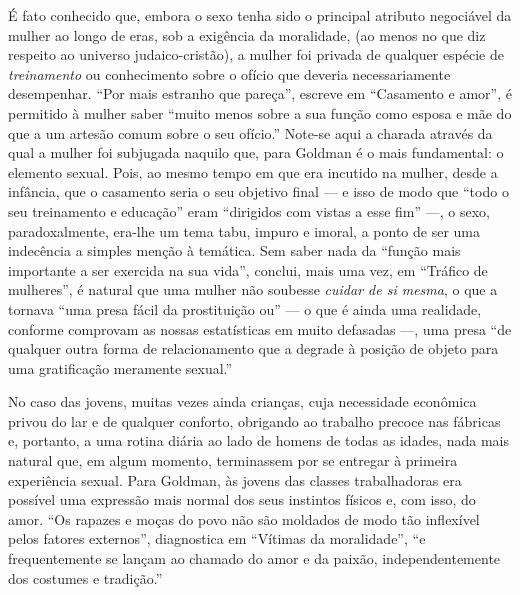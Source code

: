 É fato conhecido que, embora o sexo tenha
sido o principal atributo negociável da mulher ao longo de eras, sob a
exigência da moralidade, (ao menos no que diz respeito ao universo
judaico-cristão), a mulher foi privada de qualquer espécie de
\textit{treinamento} ou conhecimento sobre o ofício que
deveria necessariamente desempenhar. ``Por mais estranho que pareça'',
escreve em ``Casamento e amor'', é permitido à mulher saber ``muito
menos sobre a sua função como esposa e mãe do que a um artesão comum
sobre o seu ofício.'' Note-se aqui a charada através da qual a mulher
foi subjugada naquilo que, para Goldman é o mais fundamental: o elemento
sexual. Pois, ao mesmo tempo em que era incutido na mulher, desde a
infância, que o casamento seria o seu objetivo final --- e isso de modo
que ``todo o seu treinamento e educação'' eram ``dirigidos com vistas a
esse fim'' ---, o sexo, paradoxalmente, era-lhe um tema tabu, impuro e
imoral, a ponto de ser uma indecência a simples menção à temática. Sem
saber nada da ``função mais importante a ser exercida na sua vida'',
conclui, mais uma vez, em ``Tráfico de mulheres'', é natural que uma
mulher não soubesse \textit{cuidar de si mesma}, o que a tornava ``uma presa
fácil da prostituição ou'' --- o que é ainda uma realidade, conforme
comprovam as nossas estatísticas em muito defasadas ---, uma presa ``de
qualquer outra forma de relacionamento que a degrade à posição de
objeto para uma gratificação meramente sexual.''

No caso das jovens, muitas vezes ainda crianças, cuja necessidade
econômica privou do lar e de qualquer conforto, obrigando ao trabalho
precoce nas fábricas e, portanto, a uma rotina diária ao lado de homens
de todas as idades, nada mais natural que, em algum momento, terminassem
por se entregar à primeira experiência sexual. Para Goldman, às jovens
das classes trabalhadoras era possível uma expressão mais normal dos
seus instintos físicos e, com isso, do amor. ``Os rapazes e moças do
povo não são moldados de modo tão inflexível pelos fatores externos'',
diagnostica em ``Vítimas da moralidade'', ``e frequentemente se lançam
ao chamado do amor e da paixão, independentemente dos costumes e
tradição.'' 

